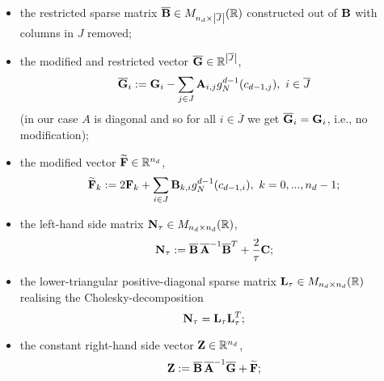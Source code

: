 \begin{algorithm}
\begin{enumerate}
\begin{itemize}
          the restricted diagonal matrix
          $\overline{\bf A} \in
            M_{\abs{\overline{J}} \times \abs{\overline{J}}}(\R)$
          constructed out of ${\bf A}$ with rows and columns in $J$ removed;
        \item
          the restricted sparse matrix
          $\overline{\bf B} \in M_{n_d \times \left\lvert\overline{J}\right\rvert}(\mathbb{R})$
          constructed out of ${\bf B}$ with columns in $J$ removed;
        \item
          the modified and restricted vector
          $\overline{\bf G} \in \mathbb{R}^{\left\lvert\overline{J}\right\rvert}$,
          \begin{equation}
            \overline{\bf G}_i :=
            {\bf G}_i
            - \sum_{j \in J} {\bf A}_{i, j} g_N^{d - 1}(c_{d - 1, j}),\
            i \in \overline{J}
          \end{equation}
          (in our case  $A$ is diagonal and so for all $i \in \overline{J}$
          we get $\overline{\bf G}_i = {\bf G}_i$, i.e., no modification);
        \item
          the modified vector $\widetilde{\bf F} \in \mathbb{R}^{n_d}$,
          \begin{equation}
            \widetilde{\bf F}_k
            := 2 {\bf F}_k
              + \sum_{i \in J} {\bf B}_{k, i} g_N^{d - 1}(c_{d - 1, i}),\
            k = 0, ..., n_d - 1;
          \end{equation}
        \item
          the left-hand side matrix ${\bf N}_\tau \in M_{n_d \times n_d}(\mathbb{R})$,
          \begin{equation}
            {\bf N}_\tau
            := \overline{\bf B}\, \overline{\bf A}^{-1} \overline{\bf B}^T
              + \frac{2}{\tau} {\bf C};
          \end{equation}
        \item
          the lower-triangular positive-diagonal sparse matrix
          ${\bf L}_\tau \in M_{n_d \times n_d}(\mathbb{R})$
          realising the Cholesky-decomposition
          \begin{equation}
            {\bf N}_\tau = {\bf L}_\tau {\bf L}^T_\tau;
          \end{equation}
        \item
          the constant right-hand side vector ${\bf Z} \in \mathbb{R}^{n_d}$,
          \begin{equation}
            {\bf Z}
            := \overline{\bf B}\, \overline{\bf A}^{-1} \overline{\bf G}
              + \widetilde{\bf F};
          \end{equation}

\end{itemize}
\end{enumerate}
\end{algorithm}
